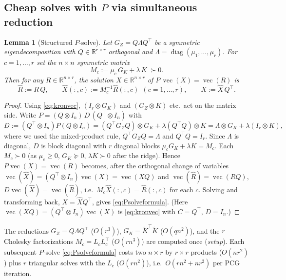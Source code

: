 \documentclass[12pt]{article}
\DeclareMathOperator{\vecop}{vec}
\DeclareMathOperator{\diag}{diag}
\newcommand{\bR}{\mathbb{R}}
\newcommand{\tK}{\tilde K}
\newtheorem{lemma}{Lemma}
\theoremstyle{definition}
\begin{document}
\subsection{Cheap solves with $P$ via simultaneous reduction}

\begin{lemma}[Structured $P$-solve]\label{lem:Psolve}
Let $G_Z=Q\Lambda Q^\top$ be a symmetric eigendecomposition with $Q\in\bR^{r\times r}$
orthogonal and $\Lambda=\diag(\mu_1,\dots,\mu_r)$. For $c=1,\dots,r$ set the
$n\times n$ symmetric matrix
\begin{equation}\label{eq:Mc}
M_c:=\mu_c\,G_K+\lambda\,K\;\succ0 .
\end{equation}
Then for any $R\in\bR^{n\times r}$, the solution $X\in\bR^{n\times r}$ of
$P\,\vecop(X)=\vecop(R)$ is
\begin{equation}\label{eq:Psolveformula}
\hat R:=R\,Q,\qquad \hat X(:,c):=M_c^{-1}\hat R(:,c)\ \ (c=1,\dots,r),
\qquad X:=\hat X\,Q^\top .
\end{equation}
\end{lemma}

\begin{proof}
Using \eqref{eq:kronvec},
$(I_r\otimes G_K)$ and $(G_Z\otimes K)$ etc.\ act on the matrix side. Write
$P=(Q\otimes I_n)\,D\,(Q^\top\otimes I_n)$ with
\[
D:=(Q^\top\otimes I_n)P(Q\otimes I_n)
=(Q^\top G_ZQ)\otimes G_K+\lambda(Q^\top Q)\otimes K
=\Lambda\otimes G_K+\lambda(I_r\otimes K),
\]
where we used the mixed-product rule, $Q^\top G_ZQ=\Lambda$ and $Q^\top Q=I_r$.
Since $\Lambda$ is diagonal, $D$ is block diagonal with $r$ diagonal blocks
$\mu_c G_K+\lambda K=M_c$. Each $M_c\succ0$ (as $\mu_c\ge0$, $G_K\succeq0$,
$\lambda K\succ0$ after the ridge). Hence $P\vecop(X)=\vecop(R)$ becomes, after the
orthogonal change of variables $\vecop(\hat X)=(Q^\top\otimes I_n)\vecop(X)
=\vecop(XQ)$ and $\vecop(\hat R)=\vecop(RQ)$,
$D\vecop(\hat X)=\vecop(\hat R)$, i.e.\ $M_c\hat X(:,c)=\hat R(:,c)$ for each $c$.
Solving and transforming back, $X=\hat XQ^\top$, gives \eqref{eq:Psolveformula}.
(Here $\vecop(XQ)=(Q^\top\otimes I_n)\vecop(X)$ is \eqref{eq:kronvec} with
$C=Q^\top$, $D=I_n$.)
\end{proof}

The reductions $G_Z=Q\Lambda Q^\top$ ($O(r^3)$), $G_K=\tK^\top\tK$ ($O(qn^2)$), and
the $r$ Cholesky factorizations $M_c=L_cL_c^\top$ ($O(rn^3)$) are computed once
(\emph{setup}). Each subsequent $P$-solve \eqref{eq:Psolveformula} costs two
$n\times r$ by $r\times r$ products ($O(nr^2)$) plus $r$ triangular solves with the
$L_c$ ($O(rn^2)$), i.e.\ $O(rn^2+nr^2)$ per PCG iteration.
\end{document}
